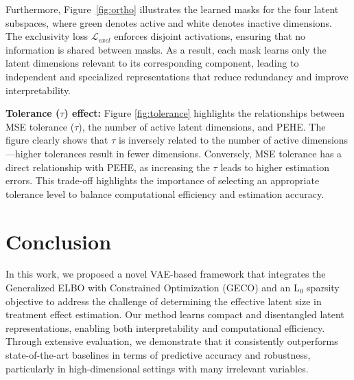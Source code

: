 \documentclass[doubleblind]{ecai}
\begin{document}
	Furthermore, Figure~\ref{fig:ortho} illustrates the learned masks for the four latent subspaces, where green denotes active and white denotes inactive dimensions. The exclusivity loss $\mathcal{L}_{\mathit{excl}}$ enforces disjoint activations, ensuring that no information is shared between masks. As a result, each mask learns only the latent dimensions relevant to its corresponding component, leading to independent and specialized representations that reduce redundancy and improve interpretability.
	
	
	
	
	
	
	\textbf{Tolerance ($\tau$) effect:} Figure \ref{fig:tolerance} highlights the relationships between MSE tolerance ($\tau$), the number of active latent dimensions, and PEHE. The figure clearly shows that $\tau$ is inversely related to the number of active dimensions—higher tolerances result in fewer dimensions. Conversely, MSE tolerance has a direct relationship with PEHE, as increasing the $\tau$ leads to higher estimation errors. This trade-off highlights the importance of selecting an appropriate tolerance level to balance computational efficiency and estimation accuracy. 
	
	
	\section{Conclusion}
	
	In this work, we proposed a novel VAE-based framework that integrates the Generalized ELBO with Constrained Optimization (GECO) and an L$_0$ sparsity objective to address the challenge of determining the effective latent size in treatment effect estimation. Our method learns compact and disentangled latent representations, enabling both interpretability and computational efficiency. Through extensive evaluation, we demonstrate that it consistently outperforms state-of-the-art baselines in terms of predictive accuracy and robustness, particularly in high-dimensional settings with many irrelevant variables.
	
\end{document}
